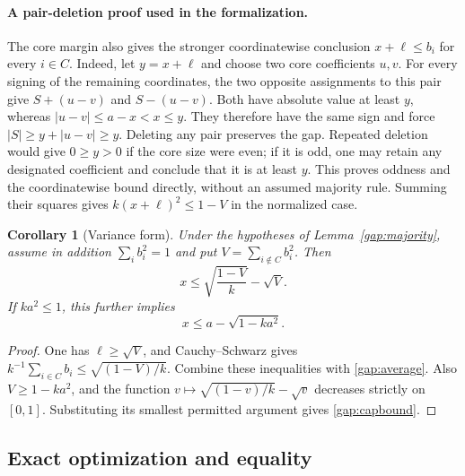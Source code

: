 \documentclass[11pt]{article}
\newtheorem{corollary}[theorem]{Corollary}
\theoremstyle{remark}\newtheorem{remark}[theorem]{Remark}
\begin{document}
\paragraph{A pair-deletion proof used in the formalization.}
The core margin also gives the stronger coordinatewise conclusion
$x+\ell\le b_i$ for every $i\in C$.
Indeed, let $y=x+\ell$ and choose two core coefficients $u,v$.
For every signing of the remaining coordinates, the two opposite
assignments to this pair give $S+(u-v)$ and $S-(u-v)$.
Both have absolute value at least $y$, whereas
$|u-v|\le a-x<x\le y$.
They therefore have the same sign and force
$|S|\ge y+|u-v|\ge y$.
Deleting any pair preserves the gap. Repeated deletion would give
$0\ge y>0$ if the core size were even; if it is odd, one may retain
any designated coefficient and conclude that it is at least $y$.
This proves oddness and the coordinatewise bound directly, without
an assumed majority rule. Summing their squares gives
$k(x+\ell)^2\le1-V$ in the normalized case.

\begin{corollary}[Variance form]\label{gap:variance}
Under the hypotheses of Lemma~\ref{gap:majority}, assume in addition
$\sum_i b_i^2=1$ and put $V=\sum_{i\notin C}b_i^2$.
Then
\begin{equation}\label{gap:variancebound}
 x\le\sqrt{\frac{1-V}{k}}-\sqrt V.
\end{equation}
If $ka^2\le1$, this further implies
\begin{equation}\label{gap:capbound}
 x\le a-\sqrt{1-ka^2}.
\end{equation}
\end{corollary}
\begin{proof}
One has $\ell\ge\sqrt V$, and Cauchy--Schwarz gives
$k^{-1}\sum_{i\in C}b_i\le\sqrt{(1-V)/k}$.
Combine these inequalities with \eqref{gap:average}.
Also $V\ge1-ka^2$, and the function
$v\mapsto\sqrt{(1-v)/k}-\sqrt v$ decreases strictly on $[0,1]$.
Substituting its smallest permitted argument gives
\eqref{gap:capbound}.
\end{proof}

\subsection{Exact optimization and equality}
\end{document}
